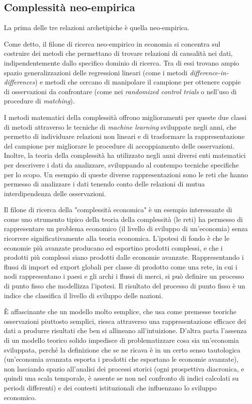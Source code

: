 \documentclass[a4paper, headings=standardclasses]{scrartcl}
\begin{document}
\subsection{Complessità neo-empirica}
La prima delle tre relazioni archetipiche è quella neo-empirica.

Come detto, il filone di ricerca neo-empirico in economia si concentra sul costruire dei metodi che permettano di trovare relazioni di causalità nei dati, indipendentemente dallo specifico dominio di ricerca. Tra di essi trovano ampio spazio generalizzazioni delle regressioni lineari (come i metodi \textit{difference-in-differences}) e metodi che cercano di manipolare il campione per ottenere coppie di osservazioni da confrontare (come nei \textit{randomized control trials} o nell'uso di procedure di \textit{matching}).

I metodi matematici della complessità offrono miglioramenti per queste due classi di metodi attraverso le tecniche di \textit{machine learning} sviluppate negli anni, che permetto di individuare relazioni non lineari e di trasformare la rappresentazione del campione per migliorare le procedure di accoppiamento delle osservazioni.
Inoltre, la teoria della complessità ha utilizzato negli anni diversi enti matematici per descrivere i dati da analizzare, sviluppando al contempo tecniche specifiche per lo scopo.
Un esempio di queste diverse rappresentazioni sono le reti che hanno permesso di analizzare i dati tenendo conto delle relazioni di mutua interdipendenza delle osservazioni. 

Il filone di ricerca della "complessità economica" \parencite{hidalgo2021} è un esempio interessante di come uno strumento tipico della teoria della complessità (le reti) ha permesso di rappresentare un problema economico (il livello di sviluppo di un'economia) senza ricorrere significativamente alla teoria economica.
L'ipotesi di fondo è che le economie più avanzate producano ed esportino prodotti complessi, e che i prodotti più complessi siano prodotti dalle economie avanzate.
Rappresentando i flussi di import ed export globali per classe di prodotto come una rete, in cui i nodi rappresentano i paesi e gli archi i flussi di merci, si può definire un processo di punto fisso che modellizza l'ipotesi.
Il risultato del processo di punto fisso è un indice che classifica il livello di sviluppo delle nazioni.

È affascinante che un modello molto semplice, che usa come premesse teoriche osservazioni piuttosto semplici, riesca attraverso una rappresentazione efficace dei dati a produrre risultati che ben si allineano all'intuizione.
D'altra parta l'assenza di un modello teorico solido impedisce di problematizzare cosa sia un'economia sviluppata, perché la definizione che se ne ricava è in un certo senso tautologica (un'economia avanzata esporta i prodotti che esportano le economie avanzate), non lasciando spazio all'analisi dei processi storici (ogni prospettiva diacronica, e quindi una scala temporale, è assente se non nel confronto di indici calcolati su periodi differenti) e dei contesti istituzionali che influenzano lo sviluppo economico.
\end{document}
